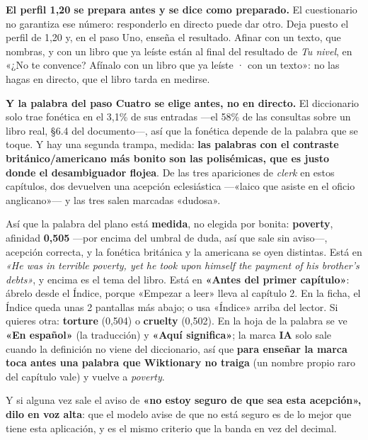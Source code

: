 \documentclass[11pt,a4paper]{article}
\begin{document}
\begin{ve}
\textbf{El perfil 1,20 se prepara antes y se dice como preparado.} El
cuestionario no garantiza ese número: responderlo en directo puede dar otro.
Deja puesto el perfil de 1,20 y, en el paso Uno, enseña el resultado.
Afinar con un texto, que nombras, y con un libro que ya leíste están al final
del resultado de \emph{Tu nivel}, en «¿No te convence? Afínalo con un libro que
ya leíste · con un texto»: no las hagas en directo, que el libro tarda en medirse.

\textbf{Y la palabra del paso Cuatro se elige antes, no en directo.} El
diccionario solo trae fonética en el 3,1\% de sus entradas ---el 58\% de las
consultas sobre un libro real, §6.4 del documento---, así que la fonética
depende de la palabra que se toque. Y hay una segunda
trampa, medida: \textbf{las palabras con el contraste británico/americano más
bonito son las polisémicas, que es justo donde el desambiguador flojea}. De las
tres apariciones de \emph{clerk} en estos capítulos, dos devuelven una acepción
eclesiástica ---«laico que asiste en el oficio anglicano»--- y las tres salen
marcadas «dudosa».

Así que la palabra del plano está \textbf{medida}, no elegida por bonita:
\textbf{poverty}, afinidad \textbf{0,505} ---por encima del umbral de duda, así
que sale sin aviso---, acepción correcta, y la fonética británica y la americana
se oyen distintas. Está en \emph{«He was in terrible poverty, yet he took upon
himself the payment of his brother's debts»}, y encima es el tema del libro. Está
en \textbf{«Antes del primer capítulo»}: ábrelo desde el Índice, porque «Empezar a
leer» lleva al capítulo 2. En la ficha, el Índice queda unas 2 pantallas más
abajo; o usa «Índice» arriba del lector. Si
quieres otra: \textbf{torture} (0,504) o \textbf{cruelty} (0,502). En la hoja
de la palabra se ve \textbf{«En español»} (la traducción) y \textbf{«Aquí
significa»}; la marca \textbf{IA} solo sale cuando la definición no viene del
diccionario, así que \textbf{para enseñar la marca toca antes una palabra que
Wiktionary no traiga} (un nombre propio raro del capítulo vale) y vuelve a
\emph{poverty}.

Y si alguna vez sale el aviso de \textbf{«no estoy seguro de que sea esta
acepción», dilo en voz alta}: que el modelo avise de que no está seguro es de
lo mejor que tiene esta aplicación, y es el mismo criterio que la banda en vez
del decimal.


\end{ve}
\end{document}
